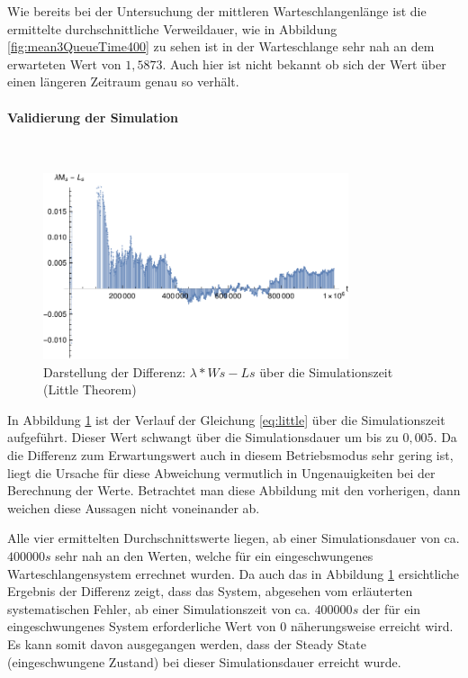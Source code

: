 Wie bereits bei der Untersuchung der mittleren Warteschlangenlänge ist die ermittelte durchschnittliche Verweildauer, wie in Abbildung \ref{fig:mean3QueueTime400} zu sehen ist in der Warteschlange sehr nah an dem erwarteten Wert von $1,5873$. Auch hier ist nicht bekannt ob sich der Wert über einen längeren Zeitraum genau so verhält.
\paragraph{Validierung der Simulation}
\\
\begin{figure}[htpb]
	\centering
	\includegraphics[width=0.8\textwidth]{abbildungen/2_Phone_VIP/Arrival_400_Serve_100_dur_1000000_Skip_0/LittleSystem.pdf}
	\caption{Darstellung der Differenz: $\lambda * Ws - Ls$ über die Simulationszeit (Little Theorem)}
	\label{fig:Little3System400}
\end{figure} 

In Abbildung \ref{fig:Little3System400} ist der Verlauf der Gleichung \ref{eq:little} über die Simulationszeit aufgeführt. 
Dieser Wert schwangt über die Simulationsdauer um bis zu $0,005$. Da die Differenz zum Erwartungswert auch in diesem Betriebsmodus sehr gering ist, liegt die Ursache für diese Abweichung vermutlich in Ungenauigkeiten bei der Berechnung der Werte. Betrachtet man diese Abbildung mit den vorherigen, dann weichen diese Aussagen nicht voneinander ab.

Alle vier ermittelten Durchschnittswerte liegen, ab einer Simulationsdauer von ca. $400000s$ sehr nah an den Werten, welche für ein eingeschwungenes Warteschlangensystem errechnet wurden. Da auch das in Abbildung  \ref{fig:Little3System400} ersichtliche Ergebnis der Differenz zeigt, dass das System, abgesehen vom erläuterten systematischen Fehler, ab einer Simulationszeit von ca. $400000s$ der für ein eingeschwungenes System erforderliche Wert von $0$ näherungsweise erreicht wird. Es kann somit davon ausgegangen werden, dass der Steady State (eingeschwungene Zustand) bei dieser Simulationsdauer erreicht wurde.

